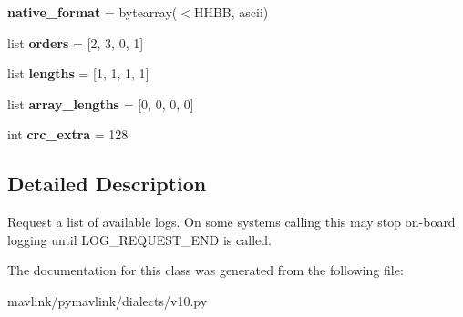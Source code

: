 \begin{DoxyCompactItemize}
{\bfseries native\+\_\+format} = bytearray(\textquotesingle{}$<$H\+H\+BB\textquotesingle{}, \textquotesingle{}ascii\textquotesingle{})
\item 
\mbox{\label{classpymavlink_1_1dialects_1_1v10_1_1MAVLink__log__request__list__message_af847d4c041acaed2da89ceff3ce7d39b}} 
list {\bfseries orders} = \mbox{[}2, 3, 0, 1\mbox{]}
\item 
\mbox{\label{classpymavlink_1_1dialects_1_1v10_1_1MAVLink__log__request__list__message_aa6c177b3e0c67018437ed213b3a82b32}} 
list {\bfseries lengths} = \mbox{[}1, 1, 1, 1\mbox{]}
\item 
\mbox{\label{classpymavlink_1_1dialects_1_1v10_1_1MAVLink__log__request__list__message_a8f61743f47b4f8258e41f93a6c1242f3}} 
list {\bfseries array\+\_\+lengths} = \mbox{[}0, 0, 0, 0\mbox{]}
\item 
\mbox{\label{classpymavlink_1_1dialects_1_1v10_1_1MAVLink__log__request__list__message_a2b56c1783e5d9c94116006e4d3574951}} 
int {\bfseries crc\+\_\+extra} = 128
\end{DoxyCompactItemize}


\subsection{Detailed Description}
\begin{DoxyVerb}Request a list of available logs. On some systems calling this
may stop on-board logging until LOG_REQUEST_END is called.
\end{DoxyVerb}
 

The documentation for this class was generated from the following file\+:\begin{DoxyCompactItemize}
\item 
mavlink/pymavlink/dialects/v10.\+py\end{DoxyCompactItemize}
